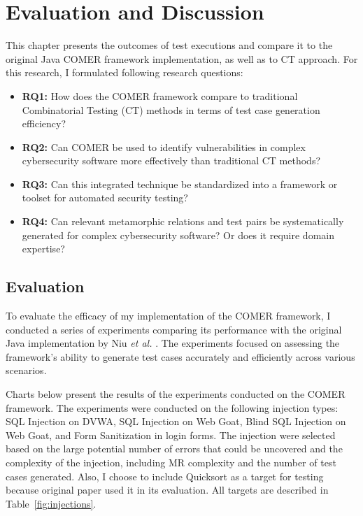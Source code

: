 
\chapter{Evaluation and Discussion}
\label{ch:eval}

This chapter presents the outcomes of test executions and compare it to the original Java COMER framework implementation, as well as to CT approach. For this research, I formulated following research questions:

\begin{itemize}
  \item \textbf{RQ1:} How does the COMER framework compare to traditional Combinatorial Testing (CT) methods in terms of test case generation efficiency?
  \item \textbf{RQ2:} Can COMER be used to identify vulnerabilities in complex cybersecurity software more effectively than traditional CT methods?
  \item \textbf{RQ3:} Can this integrated technique be standardized into a framework or toolset for automated security testing?
  \item \textbf{RQ4:} Can relevant metamorphic relations and test pairs be systematically generated for complex cybersecurity software? Or does it require domain expertise?
\end{itemize}

\section{Evaluation}
\label{sec:evaluation}

To evaluate the efficacy of my implementation of the COMER framework, I conducted a series of experiments comparing its performance with the original Java implementation by Niu \textit{et al.} \cite{comer}.
The experiments focused on assessing the framework's ability to generate test cases accurately and efficiently across various scenarios.

Charts below present the results of the experiments conducted on the COMER framework. The experiments were conducted on the following injection types: SQL Injection on DVWA, SQL Injection on Web Goat, Blind SQL Injection on  Web Goat, and Form Sanitization in login forms. The injection were selected based on the large potential number of errors that could be uncovered and the complexity of the injection, including MR complexity and the number of test cases generated. Also, I choose to include Quicksort as a target for testing because original paper used it in its evaluation. All targets are described in Table~\ref{fig:injections}.

